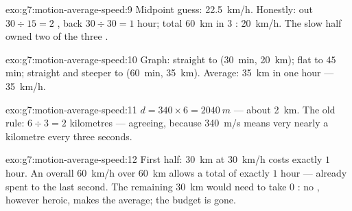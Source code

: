 \begin{solution}{exo:g7:motion-average-speed:9}
Midpoint guess: \qty{22.5}{km/h}. Honestly: out $30 \div 15 = 2$
, back $30 \div 30 = 1$ hour; total \qty{60}{km} in $3$
: \qty{20}{km/h}. The slow half owned two of the three
.
\end{solution}

\begin{solution}{exo:g7:motion-average-speed:10}
Graph: straight to (\qty{30}{min}, \qty{20}{km}); flat to
$45$ min; straight and steeper to (\qty{60}{min}, \qty{35}{km}).
Average: \qty{35}{km} in one hour --- \qty{35}{km/h}.
\end{solution}

\begin{solution}{exo:g7:motion-average-speed:11}
$d = 340 \times 6 = \qty{2040}{m}$ --- about \qty{2}{km}. The
old rule: $6 \div 3 = 2$ kilometres --- agreeing, because
\qty{340}{m/s} means very nearly a kilometre every three
seconds.
\end{solution}

\begin{solution}{exo:g7:motion-average-speed:12}
First half: \qty{30}{km} at \qty{30}{km/h} costs exactly $1$
hour. An overall \qty{60}{km/h} over \qty{60}{km} allows a total
of exactly $1$ hour --- already spent to the last second. The
remaining \qty{30}{km} would need to take $0$ : no ,
however heroic, makes the average; the budget is gone.
\end{solution}

